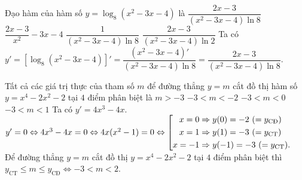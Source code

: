 \begin{ex}%
	Đạo hàm của hàm số $y=\log_8\left(x^2-3x-4\right)$ là
	\choice
	{\True $\dfrac{2x-3}{\left(x^2-3x-4\right) \ln 8}$}
	{$\dfrac{2x-3}{x^2}-3x-4$}
	{$\dfrac{1}{\left(x^2-3x-4\right) \ln 8}$}
	{$\dfrac{2x-3}{\left(x^2-3x-4\right) \ln 2}$}
	\loigiai
	{
		Ta có $y'=\left[\log_8\left(x^2-3x-4\right)\right]'=\dfrac{\left(x^2-3x-4\right)'}{\left(x^2-3x-4\right)\ln 8}=\dfrac{2x-3}{\left(x^2-3x-4\right)\ln 8}$.
	}
\end{ex}

\begin{ex}%
	Tất cả các giá trị thực của tham số $m$ để đường thẳng $y=m$ cắt đồ thị hàm số $y=x^4-2x^2-2$ tại $4$ điểm phân biệt là 
	\choice
	{$m>-3$}
	{\True $-3<m<-2$}
	{$-3<m<0$}
	{$-3<m<1$}
	\loigiai
	{
		Ta có $y'=4x^3-4x$.\\ $y'=0\Leftrightarrow 4x^3-4x=0\Leftrightarrow 4x(x^2-1)=0\Leftrightarrow \left[\begin{aligned}
			x=0 &\Rightarrow y(0)=-2~(=y_{\text{CĐ}})  \\ 
			x=1 &\Rightarrow y(1)=-3~(=y_{\text{CT}})\\ 
			x=-1 &\Rightarrow y(-1)=-3~(=y_{\text{CT}}).\end{aligned}\right.$ \\
		Để đường thẳng $y=m$ cắt đồ thị $y=x^4-2x^2-2$ tại $4$ điểm phân biệt thì $y_{\text{CT}} \le m\le y_{\text{CĐ}}\Leftrightarrow -3<m<2$.
	}
\end{ex}

